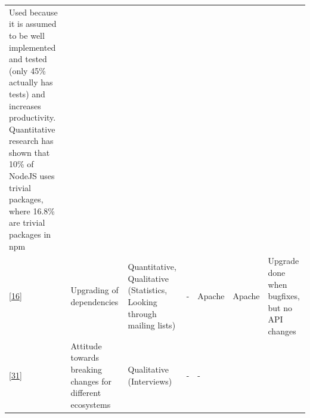 \documentclass[]{book}
\begin{document}
\begin{longtable}[]{@{}lllllll@{}}
\begin{minipage}[t]{0.10\columnwidth}
Used because it is assumed to be well implemented and tested (only 45\%
actually has tests) and increases productivity. Quantitative research
has shown that 10\% of NodeJS uses trivial packages, where 16.8\% are
trivial packages in npm\strut
\end{minipage}\tabularnewline
\begin{minipage}[t]{0.09\columnwidth}\raggedright\strut
{[}\protect\hyperlink{ref-Bavota2014}{16}{]}\strut
\end{minipage} & \begin{minipage}[t]{0.16\columnwidth}\raggedright\strut
Upgrading of dependencies\strut
\end{minipage} & \begin{minipage}[t]{0.17\columnwidth}\raggedright\strut
Quantitative, Qualitative (Statistics, Looking through mailing
lists)\strut
\end{minipage} & \begin{minipage}[t]{0.07\columnwidth}\raggedright\strut
-\strut
\end{minipage} & \begin{minipage}[t]{0.10\columnwidth}\raggedright\strut
Apache\strut
\end{minipage} & \begin{minipage}[t]{0.12\columnwidth}\raggedright\strut
Apache\strut
\end{minipage} & \begin{minipage}[t]{0.10\columnwidth}\raggedright\strut
Upgrade done when bugfixes, but no API changes\strut
\end{minipage}\tabularnewline
\begin{minipage}[t]{0.09\columnwidth}\raggedright\strut
{[}\protect\hyperlink{ref-Bogart2016}{31}{]}\strut
\end{minipage} & \begin{minipage}[t]{0.16\columnwidth}\raggedright\strut
Attitude towards breaking changes for different ecosystems\strut
\end{minipage} & \begin{minipage}[t]{0.17\columnwidth}\raggedright\strut
Qualitative (Interviews)\strut
\end{minipage} & \begin{minipage}[t]{0.07\columnwidth}\raggedright\strut
-\strut
\end{minipage} & \begin{minipage}[t]{0.10\columnwidth}\raggedright\strut
-\strut
\end{minipage} & \begin{minipage}[t]{0.12\columnwidth}\raggedright\strut

\end{minipage}
\end{longtable}
\end{document}

